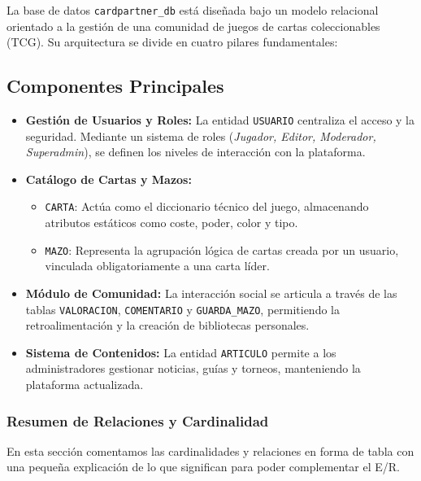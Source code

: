 \documentclass[10pt]{article}
\begin{document}
			La base de datos \texttt{cardpartner\_db} está diseñada bajo un modelo relacional orientado a la gestión de una comunidad de juegos de cartas coleccionables (TCG). Su arquitectura se divide en cuatro pilares fundamentales:
			
			\subsection{Componentes Principales}
			
			\begin{itemize}
				\item \textbf{Gestión de Usuarios y Roles:} La entidad \texttt{USUARIO} centraliza el acceso y la seguridad. Mediante un sistema de roles (\textit{Jugador, Editor, Moderador, Superadmin}), se definen los niveles de interacción con la plataforma.
				\item \textbf{Catálogo de Cartas y Mazos:} 
				\begin{itemize}
					\item \texttt{CARTA}: Actúa como el diccionario técnico del juego, almacenando atributos estáticos como coste, poder, color y tipo.
					\item \texttt{MAZO}: Representa la agrupación lógica de cartas creada por un usuario, vinculada obligatoriamente a una carta líder.
				\end{itemize}
				\item \textbf{Módulo de Comunidad:} La interacción social se articula a través de las tablas \texttt{VALORACION}, \texttt{COMENTARIO} y \texttt{GUARDA\_MAZO}, permitiendo la retroalimentación y la creación de bibliotecas personales.
				\item \textbf{Sistema de Contenidos:} La entidad \texttt{ARTICULO} permite a los administradores gestionar noticias, guías y torneos, manteniendo la plataforma actualizada.
			\end{itemize}
			
			\subsubsection{Resumen de Relaciones y Cardinalidad}
			
			En esta sección comentamos las cardinalidades y relaciones en forma de tabla con una pequeña explicación de lo que significan para poder complementar el E/R.
			
\end{document}
